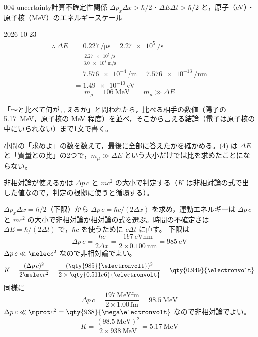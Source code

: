 \documentclass[uplatex,dvipdfmx,a4paper,11pt]{jsarticle}
\begin{document}
\begin{mondai}{004-uncertainty}{計算}{不確定性関係 $\Delta p_x\Delta x>\hbar/2$・$\Delta E\Delta t>\hbar/2$ と，原子（\unit{\electronvolt}）・原子核（\unit{\mega\electronvolt}）のエネルギースケール}
\begin{kotaeutsushi}{2026-10-23}
\begin{align*}
  \therefore\ \Delta E&=\qty{0.227}{\per\micro\second}=\qty{2.27e5}{\per\second}\\
  &=\frac{\qty{2.27e5}{\per\second}}{\qty{3.0e8}{\metre\per\second}}\\
  &=\qty{7.576e-4}{\per\metre}=\qty{7.576e-13}{\per\nano\metre}\\
  &=\qty{1.49e-10}{\electronvolt}
\end{align*}
\[ m_{\mu}=\qty{106}{\mega\electronvolt}\qquad m_{\mu}\gg\Delta E \]
\end{kotaeutsushi}
\begin{kizuki}
\item 「〜と比べて何が言えるか」と問われたら，比べる相手の数値（陽子の \qty{5.17}{\mega\electronvolt}，原子核の \unit{\mega\electronvolt} 程度）を並べ，そこから言える結論（電子は原子核の中にいられない）まで1文で書く。
\item 小問の「求めよ」の数を数えて，最後に全部に答えたかを確かめる。(4) は $\Delta E$ と「質量との比」の2つで，$m_{\mu}\gg\Delta E$ という大小だけでは比を求めたことにならない。
\item 非相対論が使えるかは $\Delta p\,c$ と $mc^{2}$ の大小で判定する（$K$ は非相対論の式で出した値なので，判定の根拠に使うと循環する）。
\end{kizuki}
\begin{tadashii}
\houshin $\Delta p_x\Delta x=\hbar/2$（下限）から $\Delta p\,c=\hbar c/(2\Delta x)$ を求め，運動エネルギーは $\Delta p\,c$ と $mc^2$ の大小で非相対論か相対論の式を選ぶ。時間の不確定さは $\Delta E=\hbar/(2\Delta t)$ で，$\hbar c$ を使うために $c\Delta t$ に直す。
\keisan {} 下限は
\[ \Delta p\,c=\frac{\hbar c}{2\Delta x}=\frac{\qty{197}{\electronvolt\nano\metre}}{2\times\qty{0.100}{\nano\metre}}=\qty{985}{\electronvolt} \]
$\Delta p\,c\ll\melec c^2$ なので非相対論でよい。
\[ K=\frac{(\Delta p\,c)^2}{2\melec c^2}=\frac{(\qty{985}{\electronvolt})^2}{2\times\qty{0.511e6}{\electronvolt}}=\qty{0.949}{\electronvolt} \]
 同様に
\[ \Delta p\,c=\frac{\qty{197}{\mega\electronvolt\femto\metre}}{2\times\qty{1.00}{\femto\metre}}=\qty{98.5}{\mega\electronvolt} \]
$\Delta p\,c\ll\mprot c^2=\qty{938}{\mega\electronvolt}$ なので非相対論でよい。
\[ K=\frac{(\qty{98.5}{\mega\electronvolt})^2}{2\times\qty{938}{\mega\electronvolt}}=\qty{5.17}{\mega\electronvolt} \]

\end{tadashii}
\end{mondai}
\end{document}
